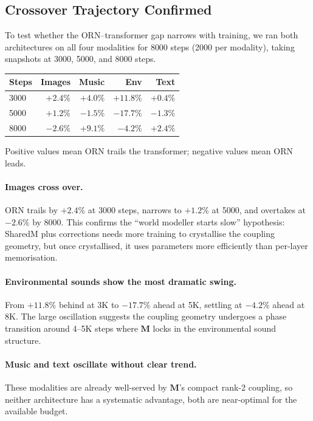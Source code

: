 \documentclass[11pt, a4paper]{article}
\newcommand{\M}{\mathbf{M}}
\theoremstyle{plain}
\theoremstyle{remark}
\begin{document}
\subsection{Crossover Trajectory Confirmed}

To test whether the ORN--transformer gap narrows with training, we ran both architectures on all four modalities for 8000 steps (2000 per modality), taking snapshots at 3000, 5000, and 8000 steps.

\begin{center}
\begin{tabular}{lrrrr}
\toprule
\textbf{Steps} & \textbf{Images} & \textbf{Music} & \textbf{Env} & \textbf{Text} \\
\midrule
3000 & $+2.4\%$ & $+4.0\%$ & $+11.8\%$ & $+0.4\%$ \\
5000 & $+1.2\%$ & $-1.5\%$ & $-17.7\%$ & $-1.3\%$ \\
8000 & $-2.6\%$ & $+9.1\%$ & $-4.2\%$ & $+2.4\%$ \\
\bottomrule
\end{tabular}
\end{center}

\noindent
Positive values mean ORN trails the transformer; negative values mean ORN leads.

\paragraph{Images cross over.}
ORN trails by $+2.4\%$ at 3000 steps, narrows to $+1.2\%$ at 5000, and overtakes at $-2.6\%$ by 8000.
This confirms the ``world modeller starts slow'' hypothesis: SharedM plus corrections needs more training to crystallise the coupling geometry, but once crystallised, it uses parameters more efficiently than per-layer memorisation.

\paragraph{Environmental sounds show the most dramatic swing.}
From $+11.8\%$ behind at 3K to $-17.7\%$ ahead at 5K, settling at $-4.2\%$ ahead at 8K.
The large oscillation suggests the coupling geometry undergoes a phase transition around 4--5K steps where $\M$ locks in the environmental sound structure.

\paragraph{Music and text oscillate without clear trend.}
These modalities are already well-served by $\M$'s compact rank-2 coupling, so neither architecture has a systematic advantage, both are near-optimal for the available budget.
\end{document}

